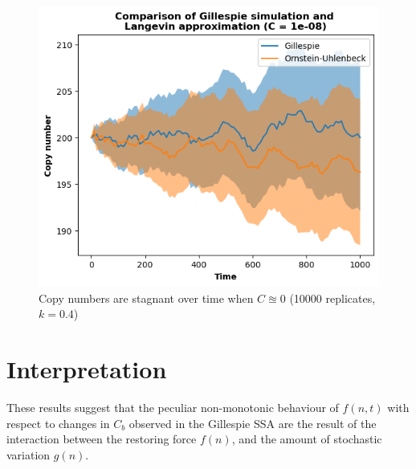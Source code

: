 \documentclass[]{article}
\begin{document}
\begin{figure} [h] 
	\centering %
	\includegraphics[scale=0.6]{figs/langevin_match_3} 
	\caption{Copy numbers are stagnant over time when $C \approxeq 0$ (10000 replicates, $k = 0.4$)} 
	\label{fig:match_3}
\end{figure}

\section{Interpretation}

These results suggest that the peculiar non-monotonic behaviour of $f(n, t)$ with respect to changes in $C_b$ observed in the Gillespie SSA are the result of the interaction between the restoring force $f(n)$, and the amount of stochastic variation $g(n)$.
\end{document}
